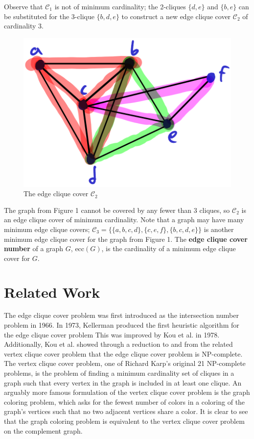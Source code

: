\documentclass[12pt]{article}
\begin{document}
    Observe that $\mathcal C_1$ is not of minimum cardinality; the 2-cliques $\{d,e\}$ and $\{b,e\}$ can be substituted for the 3-clique $\{b, d, e\}$ to construct a new edge clique cover $\mathcal C_2$ of cardinality 3.
    \begin{figure}[hbt!]
    \begin{center}
        \includegraphics[scale=.6]{fig3.png}

        \caption{The edge clique cover $\mathcal C_2$}
    \end{center}
    \end{figure}
    The graph from Figure 1 cannot be covered by any fewer than 3 cliques, so $\mathcal C_2$ is an edge clique cover of minimum cardinality.
    Note that a graph may have many minimum edge clique covers; $\mathcal C_3 = \{\{a, b, c, d\}, \{c, e, f\}, \{b, c, d, e\}\}$ is another minimum edge clique cover for the graph from Figure 1.
    The \textbf{edge clique cover number} of a graph $G$, $\text{ecc}(G)$, is the cardinality of a minimum edge clique cover for $G$.

\section*{Related Work}

    The edge clique cover problem was first introduced as the intersection number problem in 1966. %
    In 1973, Kellerman produced the first heuristic algorithm for the edge clique cover problem %
    This was improved by Kou et al. in 1978.
    Additionally, Kou et al. showed through a reduction to and from the related vertex clique cover problem that the edge clique cover problem is NP-complete.
    The vertex clique cover problem, one of Richard Karp's original 21 NP-complete problems, is the problem of finding a minimum cardinality set of cliques in a graph such that every vertex in the graph is included in at least one clique.
    An arguably more famous formulation of the vertex clique cover problem is the graph coloring problem, which asks for the fewest number of colors in a coloring of the graph's vertices such that no two adjacent vertices share a color.
    It is clear to see that the graph coloring problem is equivalent to the vertex clique cover problem on the complement graph.
    
\end{document}
